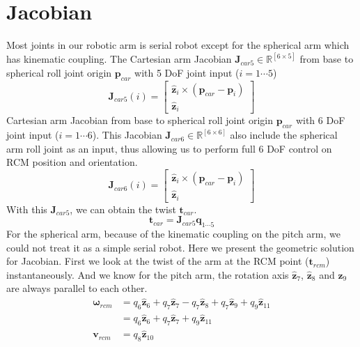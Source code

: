 \documentclass{article}
\begin{document}

\section{Jacobian}
Most joints in our robotic arm is serial robot except for the spherical arm which has kinematic coupling. The Cartesian arm Jacobian $\mathbf{J}_{car5} \in \mathbb{R}^{[6\times5]}$ from base to spherical roll joint origin $\mathbf{p}_{car}$ with 5 DoF joint input ($i=1\cdots5$)
\begin{equation}
\mathbf{J}_{car5}(i) =  \begin{bmatrix}\hat{\mathbf{z}}_i \times (\mathbf{p}_{car} - \mathbf{p}_i) \\ \hat{\mathbf{z}}_i \end{bmatrix}
\end{equation}
Cartesian arm Jacobian from base to spherical roll joint origin $\mathbf{p}_{car}$ with 6 DoF joint input ($i=1\cdots6$). This Jacobian $\mathbf{J}_{car6} \in \mathbb{R}^{[6\times6]}$ also include the spherical arm roll joint as an input, thus allowing us to perform full 6 DoF control on RCM position and orientation.
\begin{equation}
\mathbf{J}_{car6}(i) =  \begin{bmatrix}\hat{\mathbf{z}}_i \times (\mathbf{p}_{car} - \mathbf{p}_i) \\ \hat{\mathbf{z}}_i \end{bmatrix}
\end{equation}
With this $\mathbf{J}_{car5}$, we can obtain the twist $\mathbf{t}_{car}$.
\begin{equation}
\mathbf{t}_{car} = \mathbf{J}_{car5} {\mathbf{q}_{1\cdots5}}
\end{equation}
For the spherical arm, because of the kinematic coupling on the pitch arm, we could not treat it as a simple serial robot. Here we present the geometric solution for Jacobian. First we look at the twist of the arm at the RCM point ($\mathbf{t}_{rcm}$) instantaneously. And we know for the pitch arm, the rotation axis $\hat{\mathbf{z}}_7$, $\hat{\mathbf{z}}_8$ and $\hat{\mathbf{z}}_9$ are always parallel to each other.
\begin{equation}
\begin{split}
\boldsymbol{\omega}_{rcm} &= q_6\hat{\mathbf{z}}_6 +  q_7\hat{\mathbf{z}}_7 -  q_7\hat{\mathbf{z}}_8 +  q_7\hat{\mathbf{z}}_9 + q_9 \hat{\mathbf{z}}_{11}\\
&= q_6\hat{\mathbf{z}}_6 +  q_7\hat{\mathbf{z}}_7 + q_9 \hat{\mathbf{z}}_{11}\\
\mathbf{v}_{rcm} &= q_8 \hat{\mathbf{z}}_{10}
\end{split}
\end{equation}
\end{document}
